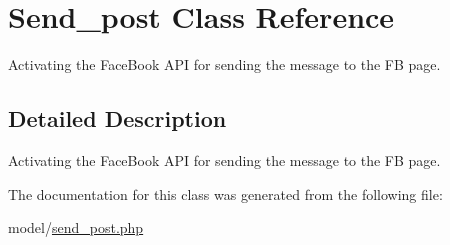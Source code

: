 \hypertarget{classSend__post}{\section{Send\-\_\-post Class Reference}
\label{classSend__post}
}


Activating the Face\-Book A\-P\-I for sending the message to the F\-B page.  




\subsection{Detailed Description}
Activating the Face\-Book A\-P\-I for sending the message to the F\-B page. 

The documentation for this class was generated from the following file\-:\begin{DoxyCompactItemize}
\item 
model/\hyperlink{send__post_8php}{send\-\_\-post.\-php}\end{DoxyCompactItemize}
